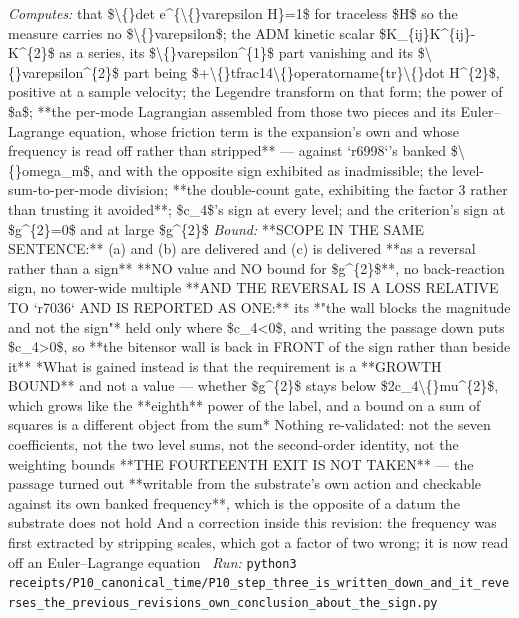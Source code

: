 \begin{description}
\emph{Computes:} that \$\textbackslash\{\}det e\textasciicircum{}\{\textbackslash\{\}varepsilon H\}=1\$ for traceless \$H\$ so the measure carries no \$\textbackslash\{\}varepsilon\$; the ADM kinetic scalar \$K\_\{ij\}K\textasciicircum{}\{ij\}-K\textasciicircum{}\{2\}\$ as a series, its \$\textbackslash\{\}varepsilon\textasciicircum{}\{1\}\$ part vanishing and its \$\textbackslash\{\}varepsilon\textasciicircum{}\{2\}\$ part being \$+\textbackslash\{\}tfrac14\textbackslash\{\}operatorname\{tr\}\textbackslash\{\}dot H\textasciicircum{}\{2\}\$, positive at a sample velocity; the Legendre transform on that form; the power of \$a\$; **the per-mode Lagrangian assembled from those two pieces and its Euler--Lagrange equation, whose friction term is the expansion's own and whose frequency is read off rather than stripped** --- against `r6998`'s banked \$\textbackslash\{\}omega\_m\$, and with the opposite sign exhibited as inadmissible; the level-sum-to-per-mode division; **the double-count gate, exhibiting the factor 3 rather than trusting it avoided**; \$c\_4\$'s sign at every level; and the criterion's sign at \$g\textasciicircum{}\{2\}=0\$ and at large \$g\textasciicircum{}\{2\}\$
 \emph{Bound:}  **SCOPE IN THE SAME SENTENCE:** (a) and (b) are delivered and (c) is delivered **as a reversal rather than a sign**  **NO value and NO bound for \$g\textasciicircum{}\{2\}\$**, no back-reaction sign, no tower-wide multiple  **AND THE REVERSAL IS A LOSS RELATIVE TO `r7036` AND IS REPORTED AS ONE:** its *"the wall blocks the magnitude and not the sign"* held only where \$c\_4<0\$, and writing the passage down puts \$c\_4>0\$, so **the bitensor wall is back in FRONT of the sign rather than beside it**  *What is gained instead is that the requirement is a **GROWTH BOUND** and not a value --- whether \$g\textasciicircum{}\{2\}\$ stays below \$2c\_4\textbackslash\{\}mu\textasciicircum{}\{2\}\$, which grows like the **eighth** power of the label, and a bound on a sum of squares is a different object from the sum*  Nothing re-validated: not the seven coefficients, not the two level sums, not the second-order identity, not the weighting bounds  **THE FOURTEENTH EXIT IS NOT TAKEN** --- the passage turned out **writable from the substrate's own action and checkable against its own banked frequency**, which is the opposite of a datum the substrate does not hold  And a correction inside this revision: the frequency was first extracted by stripping scales, which got a factor of two wrong; it is now read off an Euler--Lagrange equation
\ \emph{Run:} \texttt{python3 receipts/P10\_canonical\_time/P10\_step\_three\_is\_written\_down\_and\_it\_reverses\_the\_previous\_revisions\_own\_conclusion\_about\_the\_sign.py}

\end{description}

